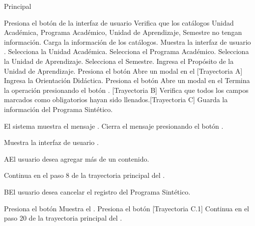 \begin{UCtrayectoria}{Principal}
    
    \UCpaso[\UCactor] Presiona el botón  de la interfaz de usuario 
    \UCpaso Verifica que los catálogos Unidad Académica, Programa Académico, Unidad de Aprendizaje, Semestre no tengan información.
    \UCpaso Carga la información de los catálogos.
    \UCpaso Muestra la interfaz de usuario .
    \UCpaso[\UCactor] Selecciona la Unidad Académica.
    \UCpaso[\UCactor] Selecciona el Programa Académico.
    \UCpaso[\UCactor] Selecciona la Unidad de Aprendizaje.
    \UCpaso[\UCactor] Selecciona el Semestre.
    \UCpaso[\UCactor] Ingresa el Propósito de la Unidad de Aprendizaje.
    \UCpaso[\UCactor] Presiona el botón 
    \UCpaso Abre un modal en el  [Trayectoria A]
    \UCpaso[\UCactor] Ingresa la Orientación Didáctica.
    \UCpaso[\UCactor] Presiona el botón 
    \UCpaso Abre un modal en el 
    \UCpaso[\UCactor] Termina la operación presionando el botón . [Trayectoria B]
    \UCpaso Verifica que todos los campos marcados como obligatorios hayan sido llenados.[Trayectoria C]
    \UCpaso Guarda la información del Programa Sintético.
    
    \UCpaso El sistema muestra el mensaje .
    \UCpaso[\UCactor] Cierra el mensaje presionando el botón . 
    
    
    
    \UCpaso Muestra la interfaz de usuario .
\end{UCtrayectoria}


\begin{UCtrayectoriaA}{A}{El usuario desea agregar más de un contenido.}

    \UCpaso Continua en el paso 8 de la trayectoria principal del .
    
\end{UCtrayectoriaA}

\begin{UCtrayectoriaA}{B}{El usuario desea cancelar el registro del Programa Sintético.}

    \UCpaso[\UCactor] Presiona el botón 
    \UCpaso Muestra el .
    \UCpaso[\UCactor] Presiona el botón  [Trayectoria C.1]
    \UCpaso Continua en el paso 20 de la trayectoria principal del .
    
\end{UCtrayectoriaA}

